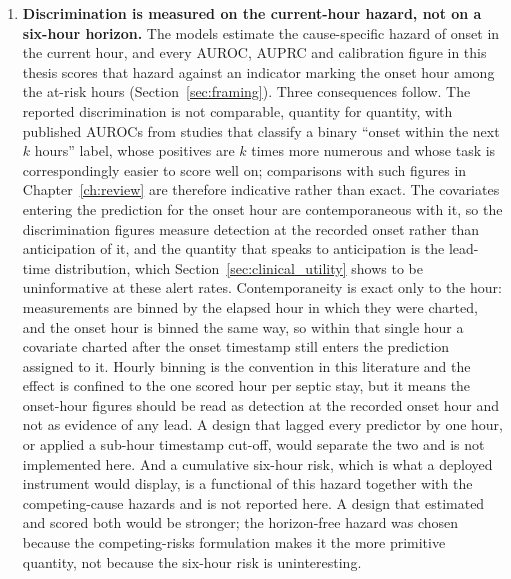 \begin{enumerate}
    \item \label{lim:current_hour}\textbf{Discrimination is measured on the
    current-hour hazard, not on a six-hour horizon.} The models estimate the cause-specific hazard of onset
    in the current hour, and every AUROC, AUPRC and calibration figure in this
    thesis scores that hazard against an indicator marking the onset hour among
    the at-risk hours (Section~\ref{sec:framing}). Three consequences follow.
    The reported discrimination is not comparable, quantity for quantity, with
    published AUROCs from studies that classify a binary ``onset within the next
    $k$ hours'' label, whose positives are $k$ times more numerous and whose task
    is correspondingly easier to score well on; comparisons with such figures in
    Chapter~\ref{ch:review} are therefore indicative rather than exact. The
    covariates entering the prediction for the onset hour are contemporaneous
    with it, so the discrimination figures measure detection at the recorded
    onset rather than anticipation of it, and the quantity that speaks to
    anticipation is the lead-time distribution, which
    Section~\ref{sec:clinical_utility} shows to be uninformative at these alert
    rates. Contemporaneity is exact only to the hour: measurements are binned
    by the elapsed hour in which they were charted, and the onset hour is binned
    the same way, so within that single hour a covariate charted after the onset
    timestamp still enters the prediction assigned to it. Hourly binning is the
    convention in this literature and the effect is confined to the one scored
    hour per septic stay, but it means the onset-hour figures should be read as
    detection at the recorded onset hour and not as evidence of any lead. A
    design that lagged every predictor by one hour, or applied a sub-hour
    timestamp cut-off, would separate the two and is not implemented here. And a cumulative six-hour risk, which is what a deployed instrument
    would display, is a functional of this hazard together with the
    competing-cause hazards and is not reported here. A design that estimated
    and scored both would be stronger; the horizon-free hazard was chosen
    because the competing-risks formulation makes it the more primitive
    quantity, not because the six-hour risk is uninteresting.


\end{enumerate}
